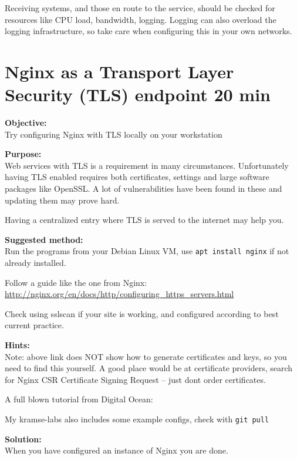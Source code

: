 \documentclass[a4paper,11pt,notitlepage]{report}
\begin{document}
Receiving systems, and those en route to the service, should be checked for resources like CPU load, bandwidth, logging. Logging can also overload the logging infrastructure, so take care when configuring this in your own networks.





\chapter{Nginx as a Transport Layer Security (TLS) endpoint 20 min}
\label{ex:nginx-tls}

{\bf Objective:}\\
Try configuring Nginx with TLS locally on your workstation


{\bf Purpose:}\\
Web services with TLS is a requirement in many circumstances. Unfortunately having TLS enabled requires both certificates, settings and large software packages like OpenSSL. A lot of vulnerabilities have been found in these and updating them may prove hard.

Having a centralized entry where TLS is served to the internet may help you.

{\bf Suggested method:}\\
Run the programs from your Debian Linux VM, use \verb+apt install nginx+ if not already installed.

Follow a guide like the one from Nginx:\\
\url{http://nginx.org/en/docs/http/configuring_https_servers.html}

Check using sslscan if your site is working, and configured according to best current practice.

{\bf Hints:}\\
Note: above link does NOT show how to generate certificates and keys, so you need to find this yourself. A good place would be at certificate providers, search for Nginx CSR Certificate Signing Request -- just dont order certificates.

A full blown tutorial from Digital Ocean:\\

My kramse-labs also includes some example configs, check with \verb+git pull+

{\bf Solution:}\\
When you have configured an instance of Nginx you are done.
\end{document}
